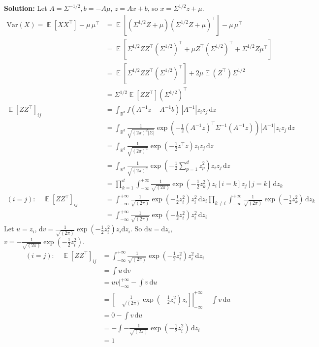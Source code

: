 \documentclass{article}
\DeclareMathOperator{\R}{\mathbb{R}}
\DeclareMathOperator{\E}{\mathbb{E}}
\newenvironment{solution}{\color{blue} \smallskip \textbf{Solution:}}{}
\begin{document}
\begin{enumerate}
    \begin{solution}
        Let $A = \Sigma^{-1/2}, b = -A\mu$, $z = Ax + b$, so $x = \Sigma^{1/2}z + \mu$.
        \begin{align*}
        \mathrm{Var}(X)=\E[XX^\top] - \mu \, \mu^\top &= \E[(\Sigma^{1/2}Z + \mu)(\Sigma^{1/2}Z + \mu)^\top] - \mu \, \mu^\top\\
        &= \E[\Sigma^{1/2}ZZ^\top(\Sigma^{1/2})^\top + \mu Z^\top (\Sigma^{1/2})^\top+\Sigma^{1/2}Z\mu^\top]\\
        &= \E[\Sigma^{1/2}ZZ^\top(\Sigma^{1/2})^\top] + 2\mu \E(Z^\top)\Sigma^{1/2}\\
        &= \Sigma^{1/2}\E[ZZ^\top](\Sigma^{1/2})^\top\\
        \E[ZZ^\top]_{ij} &= \int_{\R^d} f(A^{-1}z - A^{-1}b)\, |A^{-1}| z_i z_j \,\mathrm dz \\
        &=\int_{\R^d} \frac{1}{\sqrt{(2\pi)^d|\Sigma|}} \exp\left(-\frac{1}{2} (A^{-1}z)^\top \Sigma^{-1} (A^{-1}z)\right) |A^{-1}| z_i z_j \,\mathrm dz \\
        &=\int_{\R^d} \frac{1}{\sqrt{(2\pi)^d}} \exp\left(-\frac{1}{2} z^\top z\right) z_i z_j \,\mathrm dz \\
        &=\int_{\R^d} \frac{1}{\sqrt{(2\pi)^d}} \exp\left(-\frac{1}{2} \sum_{p=1}^d z^2_p\right) z_i z_j \,\mathrm dz \\
        &=\prod_{k=1}^d \int_{-\infty}^{+\infty} \frac{1}{\sqrt{(2\pi)}} \exp\left(-\frac{1}{2} z^2_k\right) z_i[i=k] z_j[j=k] \,\mathrm dz_k \\
         (i = j) : \quad 
         \E[ZZ^\top]_{ij}&= \int_{-\infty}^{+\infty} \frac{1}{\sqrt{(2\pi)}} \exp\left(-\frac{1}{2} z^2_i\right) z^2_i \,\mathrm dz_i \prod_{k \neq i} \int_{-\infty}^{+\infty} \frac{1}{\sqrt{(2\pi)}} \exp\left(-\frac{1}{2} z^2_k\right) \,\mathrm dz_k \\
        &= \int_{-\infty}^{+\infty} \frac{1}{\sqrt{(2\pi)}} \exp\left(-\frac{1}{2} z^2_i\right) z^2_i \,\mathrm dz_i
        \end{align*}
        Let $u = z_i$, $\mathrm dv = \frac{1}{\sqrt{(2\pi)}} \exp\left(-\frac{1}{2} z^2_i\right) z_i \mathrm dz_i$. 
        So $\mathrm du = \mathrm dz_i$, $v = -\frac{1}{\sqrt{(2\pi)}} \exp\left(-\frac{1}{2} z^2_i\right)$.
        \begin{align*}
        (i = j) : \quad 
         \E[ZZ^\top]_{ij} &= \int_{-\infty}^{+\infty} \frac{1}{\sqrt{(2\pi)}} \exp\left(-\frac{1}{2} z^2_i\right) z^2_i \,\mathrm dz_i \\
        &= \int u \,\mathrm dv \\
        &= \left. uv\right|_{-\infty}^{+\infty} - \int v \,\mathrm du \\
        &= \left.\left[-\frac{1}{\sqrt{(2\pi)}} \exp\left(-\frac{1}{2} z^2_i\right)z_i\right]\right|_{-\infty}^{+\infty} - \int v \,\mathrm du \\
        &= 0 - \int v \,\mathrm du \\
        &= - \int -\frac{1}{\sqrt{(2\pi)}} \exp\left(-\frac{1}{2} z^2_i\right) \,\mathrm dz_i \\
        &= 1
        \end{align*}


\end{solution}
\end{enumerate}
\end{document}
